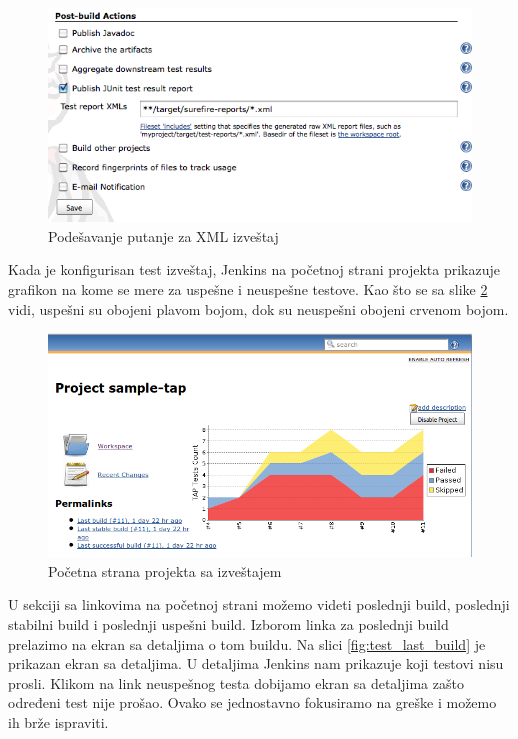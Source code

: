 \begin{figure}[h!]
\begin{center}
\includegraphics[scale=0.5]{slike/test_xml_path.png}
\end{center}
\caption{Podešavanje putanje za XML izveštaj}
\label{fig:test_xml_path}
\end{figure}

Kada je konfigurisan test izveštaj, Jenkins na početnoj strani projekta prikazuje grafikon na kome se mere za uspešne i neuspešne testove. Kao što se sa slike  \ref{fig:test_project_home} vidi, uspešni su obojeni plavom bojom, dok su neuspešni obojeni crvenom bojom. 

\begin{figure}
\begin{center}
\includegraphics[scale=0.45]{slike/test_project_home.png}
\end{center}
\caption{Početna strana projekta sa izveštajem}
\label{fig:test_project_home}
\end{figure}

U sekciji sa linkovima na početnoj strani možemo videti poslednji build, poslednji stabilni build i poslednji uspešni build. Izborom linka za poslednji build prelazimo na ekran sa detaljima o tom buildu. Na slici \ref{fig:test_last_build} je prikazan ekran sa detaljima. U detaljima Jenkins nam prikazuje koji testovi nisu prosli. Klikom na link neuspešnog testa dobijamo ekran sa detaljima zašto određeni test nije prošao. Ovako se jednostavno fokusiramo na greške i možemo ih brže ispraviti.

